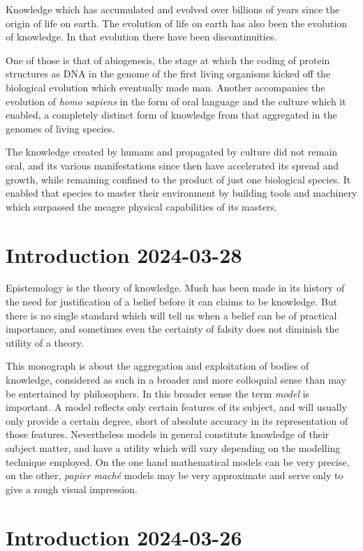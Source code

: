 \documentclass[10pt,titlepage]{book}
\begin{document}
Knowledge which has accumulated and evolved over billions of years since the origin of life on earth.
The evolution of life on earth has also been the evolution of knowledge.
In that evolution there have been discontinuities.

One of those is that of abiogenesis, the stage at which the coding of protein structures as DNA in the genome of the first living organisms kicked off the biological evolution which eventually made man.
Another accompanies the evolution of \emph{homo sapiens} in the form of oral language and the culture which it enabled, a completely distinct form of knowledge from that aggregated in the genomes of living species.

The knowledge created by humans and propagated by culture did not remain oral, and its various manifestations since then have accelerated its spread and growth, while remaining confined to the product of just one biological species.
It enabled that species to master their environment by building tools and machinery which surpassed the meagre physical capabilities of its masters.

\chapter{Introduction 2024-03-28}

Epistemology is the theory of knowledge.
Much has been made in its history of the need for justification of a belief before it can claims to be knowledge.
But there is no single standard which will tell us when a belief can be of practical importance, and sometimes even the certainty of falsity does not diminish the utility of a theory.

This monograph is about the aggregation and exploitation of bodies of knowledge, considered as such in a broader and more colloquial sense than may be entertained by philosophers.
In this broader sense the term \emph{model} is important.
A model reflects only certain features of its subject, and will usually only provide a certain degree, short of absolute accuracy in its representation of those features.
Nevertheless models in general constitute knowledge of their subject matter, and have a utility which will vary depending on the modelling technique employed.
On the one hand mathematical models can be very precise, on the other, \emph{papier mach\'e} models may be very approximate and serve only to give a rough visual impression.



\chapter{Introduction 2024-03-26}
\end{document}
